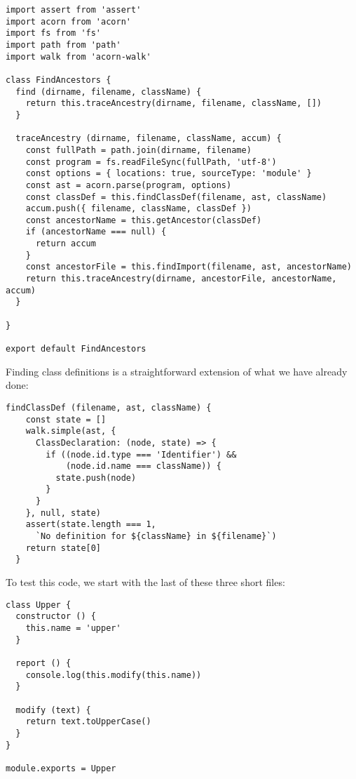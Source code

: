 \documentclass[krantzl]{krantz}
\begin{document}
\begin{lstlisting}[frame=tblr]
import assert from 'assert'
import acorn from 'acorn'
import fs from 'fs'
import path from 'path'
import walk from 'acorn-walk'

class FindAncestors {
  find (dirname, filename, className) {
    return this.traceAncestry(dirname, filename, className, [])
  }

  traceAncestry (dirname, filename, className, accum) {
    const fullPath = path.join(dirname, filename)
    const program = fs.readFileSync(fullPath, 'utf-8')
    const options = { locations: true, sourceType: 'module' }
    const ast = acorn.parse(program, options)
    const classDef = this.findClassDef(filename, ast, className)
    accum.push({ filename, className, classDef })
    const ancestorName = this.getAncestor(classDef)
    if (ancestorName === null) {
      return accum
    }
    const ancestorFile = this.findImport(filename, ast, ancestorName)
    return this.traceAncestry(dirname, ancestorFile, ancestorName, accum)
  }

}

export default FindAncestors
\end{lstlisting}



Finding class definitions is a straightforward extension of what we have already done:


\newpage


\begin{lstlisting}[frame=tblr]
  findClassDef (filename, ast, className) {
    const state = []
    walk.simple(ast, {
      ClassDeclaration: (node, state) => {
        if ((node.id.type === 'Identifier') &&
            (node.id.name === className)) {
          state.push(node)
        }
      }
    }, null, state)
    assert(state.length === 1,
      `No definition for ${className} in ${filename}`)
    return state[0]
  }
\end{lstlisting}



To test this code, we start with the last of these three short files:


\begin{lstlisting}[frame=tblr]
class Upper {
  constructor () {
    this.name = 'upper'
  }

  report () {
    console.log(this.modify(this.name))
  }

  modify (text) {
    return text.toUpperCase()
  }
}

module.exports = Upper
\end{lstlisting}
\end{document}
